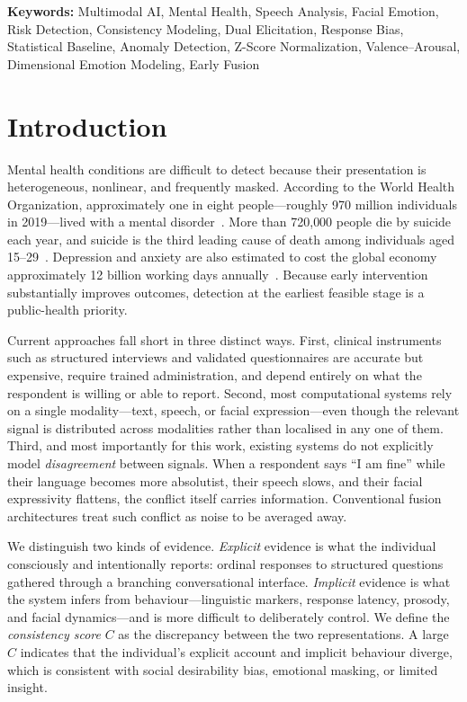 \documentclass[12pt]{article}
\begin{document}
\noindent\textbf{Keywords:} Multimodal AI, Mental Health, Speech Analysis,
Facial Emotion, Risk Detection, Consistency Modeling, Dual Elicitation,
Response Bias, Statistical Baseline, Anomaly Detection, Z-Score
Normalization, Valence--Arousal, Dimensional Emotion Modeling, Early Fusion

\section{Introduction}

Mental health conditions are difficult to detect because their
presentation is heterogeneous, nonlinear, and frequently masked.
According to the World Health Organization, approximately one in eight
people---roughly 970 million individuals in 2019---lived with a mental
disorder~\cite{who2022wmhr}. More than 720{,}000 people die by suicide
each year, and suicide is the third leading cause of death among
individuals aged 15--29~\cite{who2024suicide}. Depression and anxiety
are also estimated to cost the global economy approximately 12 billion
working days annually~\cite{who2022work}. Because early intervention
substantially improves outcomes, detection at the earliest feasible
stage is a public-health priority.

Current approaches fall short in three distinct ways. First, clinical
instruments such as structured interviews and validated questionnaires
are accurate but expensive, require trained administration, and depend
entirely on what the respondent is willing or able to report. Second,
most computational systems rely on a single modality---text, speech, or
facial expression---even though the relevant signal is distributed
across modalities rather than localised in any one of them. Third, and
most importantly for this work, existing systems do not explicitly
model \emph{disagreement} between signals. When a respondent says ``I am
fine'' while their language becomes more absolutist, their speech slows,
and their facial expressivity flattens, the conflict itself carries
information. Conventional fusion architectures treat such conflict as
noise to be averaged away.

We distinguish two kinds of evidence. \emph{Explicit} evidence is what
the individual consciously and intentionally reports: ordinal responses
to structured questions gathered through a branching conversational
interface. \emph{Implicit} evidence is what the system infers from
behaviour---linguistic markers, response latency, prosody, and facial
dynamics---and is more difficult to deliberately control. We define the
\emph{consistency score} $C$ as the discrepancy between the two
representations. A large $C$ indicates that the individual's explicit
account and implicit behaviour diverge, which is consistent with social
desirability bias, emotional masking, or limited insight.
\end{document}
